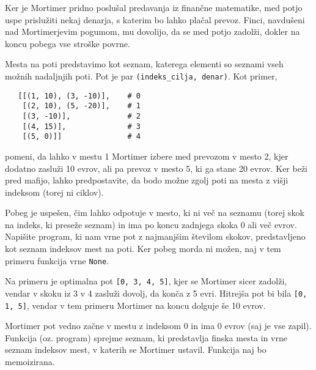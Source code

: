 \documentclass[arhiv]{../izpit}
\begin{document}
Ker je Mortimer pridno poslušal predavanja iz finančne matematike, med potjo uspe prislužiti nekaj denarja, s katerim bo lahko plačal prevoz. Finci, navdušeni nad Mortimerjevim pogumom, mu dovolijo, da se med potjo zadolži, dokler na koncu pobega vse stroške povrne.

Mesta na poti predstavimo kot seznam, katerega elementi so seznami vseh možnih nadaljnjih poti. Pot je par \verb|(indeks_cilja, denar)|. Kot primer,
\begin{verbatim}
   [[(1, 10), (3, -10)],    # 0
    [(2, 10), (5, -20)],    # 1
    [(3, -10)],             # 2
    [(4, 15)],              # 3
    [(5, 0)]]               # 4
\end{verbatim}
pomeni, da lahko v mestu 1 Mortimer izbere med prevozom v mesto 2, kjer dodatno zasluži 10 evrov, ali pa prevoz v mesto 5, ki ga stane 20 evrov. Ker beži pred mafijo, lahko predpostavite, da bodo možne zgolj poti na mesta z višji indeksom (torej ni ciklov).

Pobeg je uspešen, čim lahko odpotuje v mesto, ki ni več na seznamu (torej skok na indeks, ki preseže seznam) in ima po koncu zadnjega skoka 0 ali več evrov. Napišite program, ki nam vrne pot z najmanjšim številom skokov, predstavljeno kot seznam indeksov mest na poti. Ker pobeg morda ni možen, naj v tem primeru funkcija vrne \verb|None|.

Na primeru je optimalna pot \verb|[0, 3, 4, 5]|, kjer se Mortimer sicer zadolži, vendar v skoku iz 3 v 4 zasluži dovolj, da konča z 5 evri. Hitrejša pot bi bila \verb|[0, 1, 5]|, vendar v tem primeru Mortimer na koncu dolguje še 10 evrov.

Mortimer pot vedno začne v mestu z indeksom 0 in ima 0 evrov (saj je vse zapil). Funkcija (oz. program) sprejme seznam, ki predstavlja finska mesta in vrne seznam indeksov mest, v katerih se Mortimer ustavil. Funkcija naj bo memoizirana.
\end{document}
